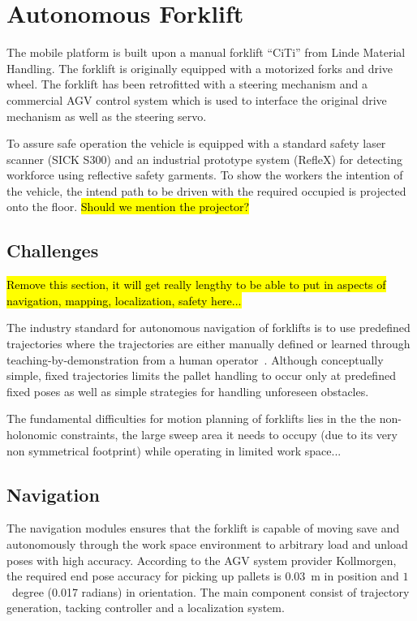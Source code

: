 \section{Autonomous Forklift}
\label{sec:agv}
%

The mobile platform is built upon a manual forklift ``CiTi'' from
Linde Material Handling. The forklift is originally equipped with a
motorized forks and drive wheel. The forklift has been retrofitted
with a steering mechanism and a commercial AGV control system which is
used to interface the original drive mechanism as well as the steering
servo.

To assure safe operation the vehicle is equipped with a standard safety
laser scanner (SICK S300) and an industrial prototype system (RefleX) for
detecting workforce using reflective safety garments. To show the workers the intention of the vehicle, the intend path to be driven with the required occupied is projected onto the floor. \hl{Should we mention the projector?}

%
\subsection{Challenges}
\label{subsec:AGV_challenges}

\hl{Remove this section, it will get really lengthy to be able to put in aspects of navigation, mapping, localization, safety here...}

The industry standard for autonomous navigation of forklifts is to use predefined
trajectories where the trajectories are either
manually defined or learned through teaching-by-demonstration from a human
operator~\cite{HellstromRingdahl.VAS06,MarshallEtAl.JFR08}.
Although conceptually simple, fixed trajectories limits the pallet handling to occur only at predefined fixed poses as well as simple strategies for handling unforeseen obstacles.

The fundamental difficulties for motion planning of forklifts lies in the the non-holonomic constraints, the large sweep area it needs to occupy (due to its very non symmetrical footprint) while operating in limited work space...


\subsection{Navigation}
\label{subsec:navigation}
%

The navigation modules ensures that the forklift is capable of moving save and autonomously through the work space environment to arbitrary load and unload poses with high accuracy. According to the AGV system provider Kollmorgen, the required end pose accuracy
for picking up pallets is $0.03$~m in position and $1$~degree (0.017 radians) in
orientation. The main component consist of trajectory generation, tacking controller and a localization system. 
 
